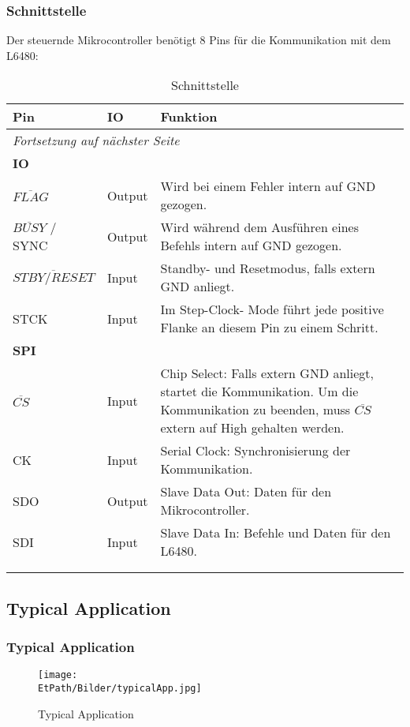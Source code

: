 		 \subsubsection{Schnittstelle}
		 \fi
	  		Der steuernde Mikrocontroller benötigt 8 Pins für die Kommunikation mit dem L6480: 
	  		\begin{longtable}{l l p{7cm}} \toprule
	  			\textbf{Pin} 	& \textbf{IO} 	& \textbf{Funktion} \\
	  			\midrule
	  			\endhead
	  			\multicolumn{3}{l}{\emph{Fortsetzung auf nächster Seite}} \\ \bottomrule \endfoot \endlastfoot 			
	  			\textbf{IO}\\ \addlinespace
	  			$\overline{FLAG}$& Output 				& Wird bei einem Fehler intern auf GND gezogen. \\ \addlinespace
	  			$\overline{BUSY}$ / SYNC & Output		& Wird während dem Ausführen eines Befehls intern auf GND gezogen.\\ \addlinespace
	  			$\overline{STBY / RESET}$& Input		& Standby- und Resetmodus, falls extern GND anliegt. \\ \addlinespace
	  			STCK			& Input			& Im Step-Clock- Mode führt jede positive Flanke an diesem Pin zu einem Schritt. \\ \addlinespace
	  			\textbf{SPI}\\ \addlinespace
	  			$\overline{CS}$	& Input			& Chip Select: Falls extern GND anliegt, startet die Kommunikation. Um die Kommunikation zu beenden, muss $\overline{CS}$ extern auf High gehalten werden. \\ \addlinespace
	  			CK				& Input			& Serial Clock: Synchronisierung der Kommunikation. \\ \addlinespace
	  			SDO				& Output		& Slave Data Out: Daten für den Mikrocontroller. \\ \addlinespace
	  			SDI				& Input			& Slave Data In: Befehle und Daten für den L6480. \\ \addlinespace
	  			\bottomrule
	  			\\
	  			\caption{Schnittstelle} 
	  			\label{Schnittstelle}
	  		\end{longtable}	
	  	\ifSTANDALONE	
	 	\subsection{Typical Application}
	 	\fi
	 	\ifEMBED
	 	\subsubsection{Typical Application}
	 	\fi
			 	\begin{figure}[h]
			 		\centering
			 		\texttt{[image: \\EtPath/Bilder/typicalApp.jpg]}
			 		\label{fig:typApp}
			 		\caption{Typical Application}
			 	\end{figure}
